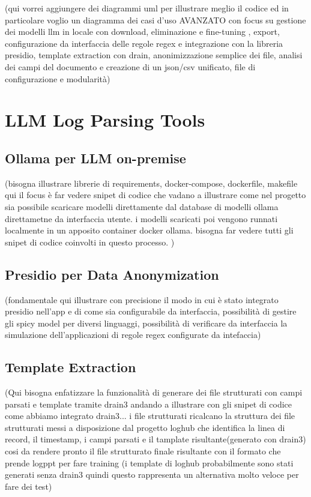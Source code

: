 (qui vorrei aggiungere dei diagrammi uml per illustrare meglio il codice ed in  particolare voglio un  diagramma dei casi d'uso AVANZATO con focus su gestione dei modelli llm in locale con download, eliminazione e fine-tuning , export, configurazione da interfaccia delle regole regex e integrazione con la libreria presidio, template extraction con drain, anonimizzazione semplice dei file, analisi dei campi del documento e creazione di un json/csv unificato, file di configurazione e modularità)

\section{LLM Log Parsing Tools}

\subsection{Ollama per LLM on-premise}

(bisogna illustrare librerie di requirements, docker-compose, dockerfile, makefile
qui il focus è far vedere snipet di codice che  vadano a illustrare come nel progetto sia possibile scaricare modelli direttamente dal database di modelli ollama direttametne da interfaccia utente. i modelli scaricati poi vengono runnati localmente in un apposito container docker ollama. bisogna far vedere tutti gli snipet di codice coinvolti in questo processo. )

\subsection{Presidio per Data Anonymization}
(fondamentale qui illustrare con precisione il modo in cui è stato integrato presidio nell'app e di come sia configurabile da interfaccia, possibilità di gestire gli spicy model per diversi linguaggi, possibilità di verificare da interfaccia la simulazione dell'applicazioni di regole regex configurate da intefaccia)

\subsection{Template Extraction}

(Qui bisogna enfatizzare la funzionalità di generare dei file strutturati con campi parsati e template tramite drain3 andando a illustrare con gli snipet di codice come abbiamo integrato drain3... i file strutturati ricalcano la struttura dei file strutturati messi a disposizione dal progetto loghub che identifica la linea di record, il timestamp, i campi parsati e il tamplate risultante(generato con drain3) cosi da rendere pronto il file strutturato finale risultante con il formato che prende logppt per fare training (i template di loghub probabilmente sono stati generati senza drain3 quindi questo rappresenta un alternativa molto veloce per fare dei test)